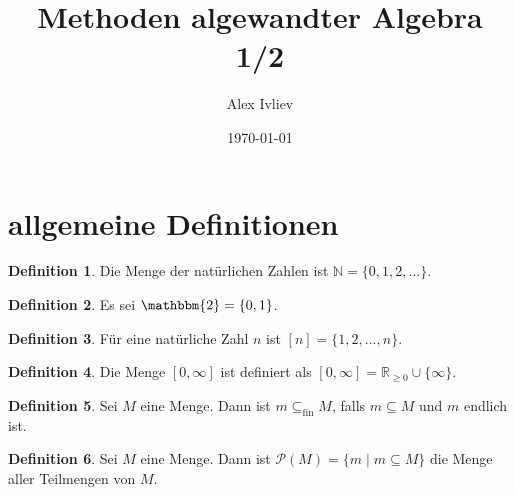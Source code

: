 \documentclass{article}
\begin{document}

\newtheorem{theorem}{Satz}

\newtheorem{lemma}{Lemma}

\newtheorem{corollary}{Korollar}

\theoremstyle{remark}
\newtheorem{example}{Beispiel}

\theoremstyle{definition}
\newtheorem{definition}{Definition}

\theoremstyle{remark}
\newtheorem{remark}{Anmerkung}

\begin{titlepage}
\title{Methoden algewandter Algebra 1/2}
\date{\today}
\author{Alex Ivliev}
\maketitle
\end{titlepage}

\tableofcontents 
\newpage

\section{allgemeine Definitionen}
\begin{definition}
  Die Menge der natürlichen Zahlen ist ${\mathbb{N} = \{0, 1, 2, ...\}}$.
\end{definition}

\begin{definition}
  Es sei $\mathbbm{2} = \{0, 1\}$.
\end{definition}

\begin{definition}
  Für eine natürliche Zahl $n$ ist $[n] = \{1, 2, ..., n\}$.
\end{definition}

\begin{definition}
  Die Menge $[0, \infty]$ ist definiert als $[0, \infty] = \mathbb{R}_{\geq 0} \cup \{\infty\}$.
\end{definition}

\begin{definition}
  Sei $M$ eine Menge. 
  Dann ist $m \mathrel{\subseteq_\text{fin}} M$, falls $m \subseteq M$ und $m$ endlich ist.
\end{definition}

\begin{definition}
  Sei $M$ eine Menge.
  Dann ist $\mathcal{P}(M) = \{m \mid m \subseteq M\}$
  die Menge aller Teilmengen von $M$.
\end{definition}
\end{document}
